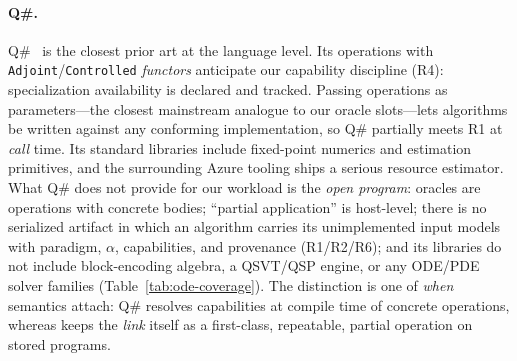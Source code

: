 \paragraph{Q\#.}
Q\#~\cite{svore2018qsharp} is the closest prior art at the language level.
Its operations with \texttt{Adjoint}/\texttt{Controlled} \emph{functors}
anticipate our capability discipline (R4): specialization availability is
declared and tracked.  Passing operations as parameters---the closest
mainstream analogue to our oracle slots---lets algorithms be written against
any conforming implementation, so Q\# partially meets R1 at \emph{call}
time.  Its standard libraries include fixed-point numerics and estimation
primitives, and the surrounding Azure tooling ships a serious resource
estimator.  What Q\# does not provide for our workload is
the \emph{open program}: oracles are operations with concrete bodies;
``partial application'' is host-level; there is no serialized artifact in
which an algorithm carries its unimplemented input models with paradigm,
$\alpha$, capabilities, and provenance (R1/R2/R6); and its libraries do not
include block-encoding algebra, a QSVT/QSP engine, or any ODE/PDE solver
families (Table~\ref{tab:ode-coverage}).  The distinction is one of
\emph{when} semantics attach: Q\# resolves capabilities at compile time of
concrete operations, whereas \pqlang{} keeps the \emph{link} itself as a
first-class, repeatable, partial operation on stored programs.

